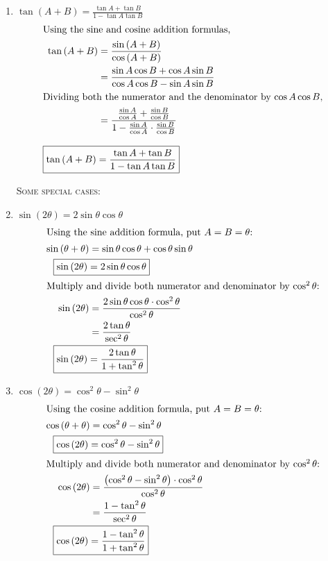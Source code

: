 \documentclass{article}
\begin{document}
\begin{enumerate}
    \item $\tan\left(A + B\right) = \frac{\tan A + \tan B}{1-\tan A \tan B}$
    \begin{align*}
        \intertext{Using the sine and cosine addition formulas,}
        \tan\left(A+B\right) &= \frac{\sin\left(A+B\right)}{\cos\left(A+B\right)}\\
        &= \frac{\sin A\cos B + \cos A\sin B}{\cos A\cos B - \sin A\sin B}\\
        \intertext{Dividing both the numerator and the denominator by \(\cos A\cos B\),}
        &= \frac{\frac{\sin A}{\cos A} + \frac{\sin B}{\cos B}}{1 - \frac{\sin A}{\cos A} \cdot \frac{\sin B}{\cos B}}\\[3mm]
        \Aboxed{\tan\left(A + B\right)&= \frac{\tan A + \tan B}{1 - \tan A \tan B}}
    \end{align*}

    \begin{center}
        \textsc{Some special cases:}
    \end{center}
    \item $\sin\left(2\theta\right) = 2\sin \theta\cos \theta$
    \begin{align*}
        \intertext{Using the sine addition formula, put \(A = B = \theta\):}
        \sin\left(\theta + \theta\right) &= \sin \theta \cos \theta + \cos \theta \sin \theta\\
        \Aboxed{\sin\left(2\theta\right) &= 2\sin \theta \cos \theta}\\
        \intertext{Multiply and divide both numerator and denominator by $\cos^2\theta$:}
        \sin\left(2\theta\right) &= \frac{2\sin \theta \cos \theta \cdot \cos^2\theta}{\cos^2 \theta}\\
        &= \frac{2\tan \theta}{\sec^2 \theta}\\
        \Aboxed{\sin\left(2\theta\right) &= \frac{2\tan \theta}{1+\tan^2 \theta}}
    \end{align*}

    \item $\cos\left(2\theta\right) = \cos^2 \theta - \sin^2 \theta$
    \begin{align*}
        \intertext{Using the cosine addition formula, put \(A = B = \theta\):}
        \cos\left(\theta + \theta\right) &= \cos^2 \theta - \sin^2 \theta\\
        \Aboxed{\cos\left(2\theta\right) &= \cos^2 \theta - \sin^2 \theta}\\
        \intertext{Multiply and divide both numerator and denominator by $\cos^2\theta$:}
        \cos\left(2\theta\right) &= \frac{\left(\cos^2 \theta - \sin^2 \theta \right)\cdot \cos^2\theta}{\cos^2 \theta}\\
        &= \frac{1-\tan^2\theta}{\sec^2\theta}\\
        \Aboxed{\cos\left(2\theta\right) &= \frac{1-\tan^2\theta}{1+\tan^2\theta}}
    \end{align*}


\end{enumerate}
\end{document}
